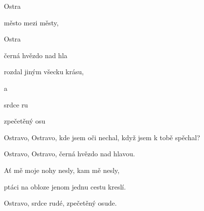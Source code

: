 

\zs
{} Ostra

město mezi městy,  

 Ostra

černá hvězdo nad hla
\ks

\zr
{} rozdal jiným  všecku krásu,

 a 

 srdce ru

zpečetěný osu  
\kr

\zs
Ostravo, Ostravo, kde jsem oči nechal, když jsem k tobě spěchal?

Ostravo, Ostravo, černá hvězdo nad hlavou.
\ks

\zr
Ať mě moje nohy nesly, kam mě nesly,

ptáci na obloze jenom jednu cestu kreslí.

Ostravo, srdce rudé, zpečetěný osude.
\kr

\kp
